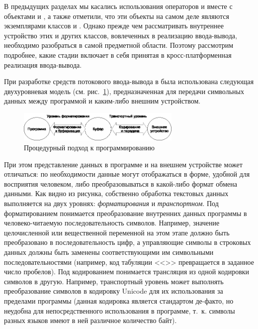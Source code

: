 В предыдущих разделах мы касались использования операторов \Sys{{<}{<}} и
\Sys{{>}{>}} вместе с объектами   и
, а также отметили, что эти объекты на самом деле являются экземплярами классов
 и . Однако прежде чем рассматривать внутреннее устройство
этих и других классов, вовлеченных в реализацию ввода-вывода, необходимо разобраться в самой предметной области.
Поэтому рассмотрим подробнее, какие стадии включает в себя принятая в  кросс-платформенная реализация ввода-вывода. 

При разработке средств потокового ввода-вывода в  была использована следующая двухуровневая модель 
(см. рис.~\ref{ch10:refDrawing2}), предназначенная для передачи символьных данных между программой и каким-либо внешним
устройством. 

\begin{figure}[htb]
\begin{center}
\includegraphics[width=0.7\textwidth]{img/ris_10_3}
\caption{Процедурный подход к программированию}
\label{ch10:refDrawing2}
\end{center}
\end{figure}

При этом представление данных в программе и на внешнем устройстве может  отличаться: по необходимости данные могут
отображаться в форме, удобной для восприятия человеком, либо преобразовываться в какой-либо формат обмена данными. Как
видно из рисунка, собственно обработка текстовых данных выполняется на двух уровнях:
\emph{форматирования} и \emph{транспортном}. Под форматированием понимается
преобразование внутренних данных программы в человеко-читаемую последовательность символов. Например, значение
целочисленной или вещественной переменной на этом этапе должно быть преобразовано в последовательность цифр, а
управляющие символы в строковых данных должны быть заменены соответствующими им символьными последовательностями
(например, код табуляции <<>> превращается в заданное число пробелов). Под
кодированием понимается трансляция из одной кодировки символов в другую. Например, транспортный уровень может выполнять
преобразование символов в кодировку Unicode для их использования за пределами программы (данная кодировка является
стандартом де-факто, но неудобна для непосредственного использования в программе,  т.~к. символы разных языков имеют в
ней различное количество байт).

